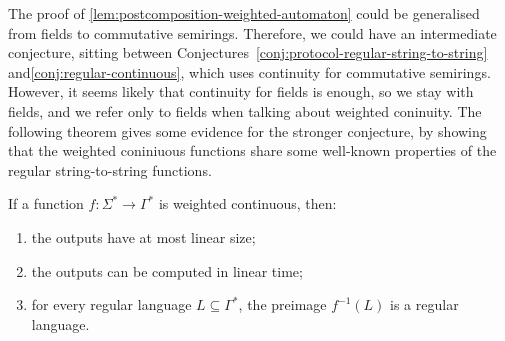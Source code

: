 The proof of \cref{lem:postcomposition-weighted-automaton} could be generalised from fields to commutative semirings. Therefore, we could have an intermediate conjecture, sitting between Conjectures~\ref{conj:protocol-regular-string-to-string} and\ref{conj:regular-continuous}, which uses continuity for commutative semirings. However, it seems likely that continuity for fields is enough, so we stay with fields, and we refer only to fields when talking about weighted coninuity. 
The following theorem gives some evidence for the stronger conjecture, by showing that the weighted coniniuous functions share some well-known properties of the regular string-to-string functions. 

\begin{theorem}\label{thm:evidence-for-the-conjecture}
    If a function $f : \Sigma^* \to \Gamma^*$ is  weighted continuous, then:
    \begin{enumerate}
        \item \label{it:linear-size-outputs} the outputs have at most linear size;
        \item \label{it:linear-time-computable} the outputs can be   computed in linear time;
        \item \label{it:regular-preimages} for every regular language $L \subseteq \Gamma^*$, the preimage $f^{-1}(L)$ is a regular language.
    \end{enumerate}
\end{theorem}


